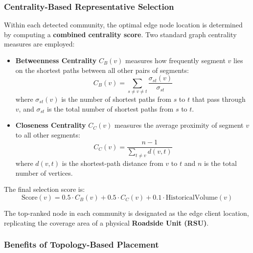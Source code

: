 \documentclass[pdflatex,sn-mathphys-num]{sn-jnl}
\theoremstyle{thmstyleone}
\theoremstyle{thmstyletwo}
\theoremstyle{thmstylethree}
\begin{document}
\subsubsection{Centrality-Based Representative Selection}

Within each detected community, the optimal edge node location is determined by
computing a \textbf{combined centrality score}. Two standard graph centrality
measures are employed:

\begin{itemize}
    \item \textbf{Betweenness Centrality} $C_B(v)$ measures how frequently
    segment $v$ lies on the shortest paths between all other pairs of segments:
    \begin{equation}
        C_B(v) = \sum_{s \neq v \neq t} \frac{\sigma_{st}(v)}{\sigma_{st}}
        \label{eq:betweenness}
    \end{equation}
    where $\sigma_{st}(v)$ is the number of shortest paths from $s$ to $t$ that
    pass through $v$, and $\sigma_{st}$ is the total number of shortest paths
    from $s$ to $t$.

    \item \textbf{Closeness Centrality} $C_C(v)$ measures the average proximity
    of segment $v$ to all other segments:
    \begin{equation}
        C_C(v) = \frac{n-1}{\sum_{t \neq v} d(v, t)}
        \label{eq:closeness}
    \end{equation}
    where $d(v, t)$ is the shortest-path distance from $v$ to $t$ and $n$ is the
    total number of vertices.
\end{itemize}

The final selection score is:
\begin{equation}
    \mathrm{Score}(v) = 0.5 \cdot C_B(v) + 0.5 \cdot C_C(v)
                      + 0.1 \cdot \mathrm{HistoricalVolume}(v)
    \label{eq:placement_score}
\end{equation}

The top-ranked node in each community is designated as the edge client location,
replicating the coverage area of a physical \textbf{Roadside Unit (RSU)}.

\subsubsection{Benefits of Topology-Based Placement}
\end{document}
